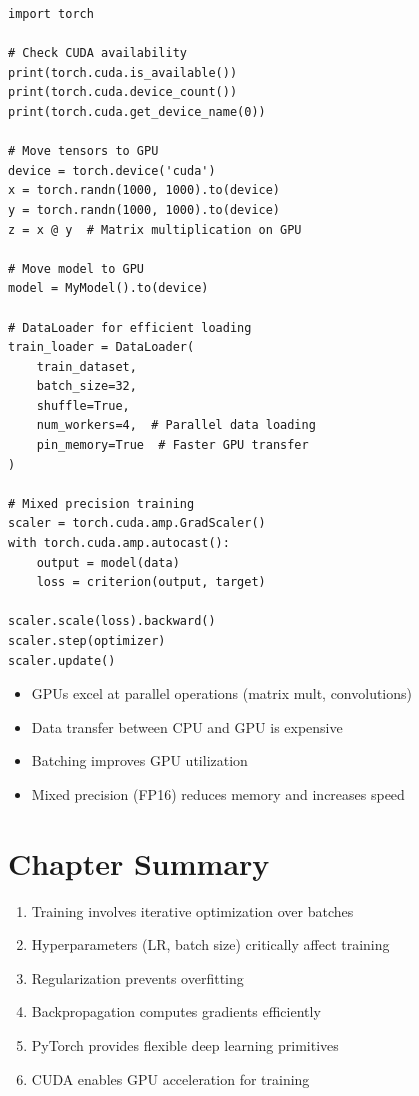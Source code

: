 \begin{code}
    \label{code:cuda_pytorch}
\begin{verbatim}
import torch

# Check CUDA availability
print(torch.cuda.is_available())
print(torch.cuda.device_count())
print(torch.cuda.get_device_name(0))

# Move tensors to GPU
device = torch.device('cuda')
x = torch.randn(1000, 1000).to(device)
y = torch.randn(1000, 1000).to(device)
z = x @ y  # Matrix multiplication on GPU

# Move model to GPU
model = MyModel().to(device)

# DataLoader for efficient loading
train_loader = DataLoader(
    train_dataset,
    batch_size=32,
    shuffle=True,
    num_workers=4,  # Parallel data loading
    pin_memory=True  # Faster GPU transfer
)

# Mixed precision training
scaler = torch.cuda.amp.GradScaler()
with torch.cuda.amp.autocast():
    output = model(data)
    loss = criterion(output, target)

scaler.scale(loss).backward()
scaler.step(optimizer)
scaler.update()
\end{verbatim}
\end{code}

\begin{properties}
\begin{itemize}
    \item GPUs excel at parallel operations (matrix mult, convolutions)
    \item Data transfer between CPU and GPU is expensive
    \item Batching improves GPU utilization
    \item Mixed precision (FP16) reduces memory and increases speed
\end{itemize}
\end{properties}

\section{Chapter Summary}

\begin{enumerate}
    \item Training involves iterative optimization over batches
    \item Hyperparameters (LR, batch size) critically affect training
    \item Regularization prevents overfitting
    \item Backpropagation computes gradients efficiently
    \item PyTorch provides flexible deep learning primitives
    \item CUDA enables GPU acceleration for training
\end{enumerate}

